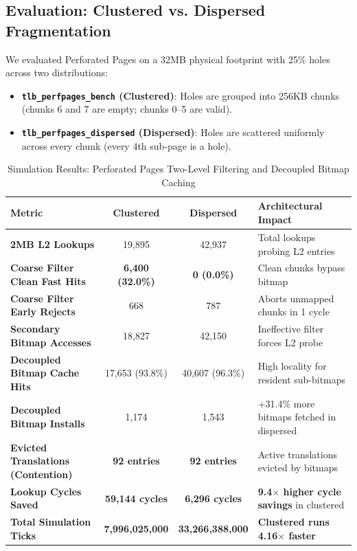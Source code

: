 \subsection{Evaluation: Clustered vs. Dispersed Fragmentation}
We evaluated Perforated Pages on a 32MB physical footprint with 25\% holes across two distributions:
\begin{itemize}
    \item \textbf{\texttt{tlb\_perfpages\_bench} (Clustered)}: Holes are grouped into 256KB chunks (chunks 6 and 7 are empty; chunks 0--5 are valid).
    \item \textbf{\texttt{tlb\_perfpages\_dispersed} (Dispersed)}: Holes are scattered uniformly across every chunk (every 4th sub-page is a hole).
\end{itemize}

\begin{table}[H]
\centering
\small
\caption{Simulation Results: Perforated Pages Two-Level Filtering and Decoupled Bitmap Caching}
\label{tab:perfpages_results}
\begin{tabularx}{\textwidth}{lccX}
\toprule
\textbf{Metric} & \textbf{Clustered} & \textbf{Dispersed} & \textbf{Architectural Impact} \\
\midrule
\textbf{2MB L2 Lookups} & 19,895 & 42,937 & Total lookups probing L2 entries \\
\textbf{Coarse Filter Clean Fast Hits} & \textbf{6,400 (32.0\%)} & \textbf{0 (0.0\%)} & Clean chunks bypass bitmap \\
\textbf{Coarse Filter Early Rejects} & 668 & 787 & Aborts unmapped chunks in 1 cycle \\
\textbf{Secondary Bitmap Accesses} & 18,827 & 42,150 & Ineffective filter forces L2 probe \\
\textbf{Decoupled Bitmap Cache Hits} & 17,653 (93.8\%) & 40,607 (96.3\%) & High locality for resident sub-bitmaps \\
\textbf{Decoupled Bitmap Installs} & 1,174 & 1,543 & +31.4\% more bitmaps fetched in dispersed \\
\textbf{Evicted Translations (Contention)} & \textbf{92 entries} & \textbf{92 entries} & Active translations evicted by bitmaps \\
\textbf{Lookup Cycles Saved} & \textbf{59,144 cycles} & \textbf{6,296 cycles} & \textbf{9.4$\times$ higher cycle savings} in clustered \\
\textbf{Total Simulation Ticks} & \textbf{7,996,025,000} & \textbf{33,266,388,000} & \textbf{Clustered runs 4.16$\times$ faster} \\
\bottomrule
\end{tabularx}
\end{table}

